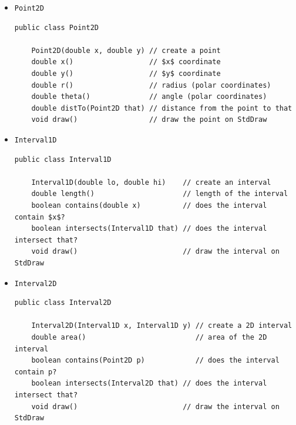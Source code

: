 \documentclass[8pt,a4paper,compress]{beamer}
\begin{document}
\begin{frame}[fragile]
\begin{itemize}
\item \lstinline{Point2D}
\begin{lstlisting}[language={},mathescape]
public class Point2D

    Point2D(double x, double y) // create a point
    double x()                  // $x$ coordinate
    double y()                  // $y$ coordinate
    double r()                  // radius (polar coordinates)
    double theta()              // angle (polar coordinates)
    double distTo(Point2D that) // distance from the point to that
    void draw()                 // draw the point on StdDraw
\end{lstlisting}

\item \lstinline{Interval1D}
\begin{lstlisting}[language={},mathescape]
public class Interval1D

    Interval1D(double lo, double hi)    // create an interval
    double length()                     // length of the interval
    boolean contains(double x)          // does the interval contain $x$?
    boolean intersects(Interval1D that) // does the interval intersect that?
    void draw()                         // draw the interval on StdDraw          
\end{lstlisting}

\item \lstinline{Interval2D}
\begin{lstlisting}[language={},mathescape]
public class Interval2D
          
    Interval2D(Interval1D x, Interval1D y) // create a 2D interval
    double area()                          // area of the 2D interval 
    boolean contains(Point2D p)            // does the interval contain p?
    boolean intersects(Interval2D that) // does the interval intersect that?
    void draw()                         // draw the interval on StdDraw
\end{lstlisting}
\end{itemize}
\end{frame}
\end{document}
